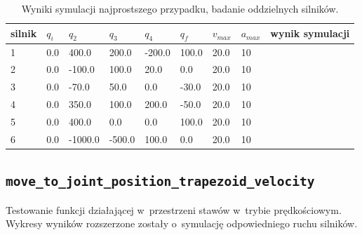 \documentclass[a4paper, 12pt]{article}
\begin{document}
	\begin{table}[H]
	\centering
	\begin{tabular}{|m{2.5em}|m{3em}|m{3.5em}|m{3em}|m{3em}|m{3em}|m{4em}|m{3em}|m{5em}|}
	\hline
	silnik&$ q_i $ & $ q_2 $ & $ q_3 $ & $q_4$ & $ q_f $ & $ v_{max} $ & $ a_{max} $&wynik symulacji\\
	\hline
	\hline
	\hspace{1em}1& 0.0 & 400.0 & 200.0 & -200.0 & 100.0 & 20.0 & 10&\hspace{2em}\checkmark\\ %
	\hline
	\hspace{1em}2& 0.0 & -100.0 & 100.0 & 20.0 & 0.0 & 20.0 & 10&\hspace{2em}\checkmark\\ %
	\hline
	\hspace{1em}3& 0.0 & -70.0 & 50.0 & 0.0 & -30.0 & 20.0 & 10&\hspace{2em}\checkmark\\ %
	\hline
	\hspace{1em}4& 0.0 & 350.0 & 100.0 & 200.0 & -50.0 & 20.0 & 10&\hspace{2em}\checkmark\\  %
	\hline
	\hspace{1em}5& 0.0 & 400.0 & 0.0 & 0.0 & 100.0 & 20.0 & 10&\hspace{2em}\checkmark\\  %
	\hline
	\hspace{1em}6& 0.0 & -1000.0 & -500.0 & 100.0 & 0.0 & 20.0 & 10&\hspace{2em}\checkmark\\  %
	\hline
	\end{tabular}
	\caption{Wyniki symulacji najprostszego przypadku, badanie oddzielnych silników.}
	\label{tab:setup12}
	\end{table}	
	
	\subsection{\texttt{move\_to\_joint\_position\_trapezoid\_velocity}}
	Testowanie funkcji działającej w~przestrzeni stawów w~trybie prędkościowym. Wykresy wyników rozszerzone zostały o~symulację odpowiedniego ruchu silników.
	
\end{document}
